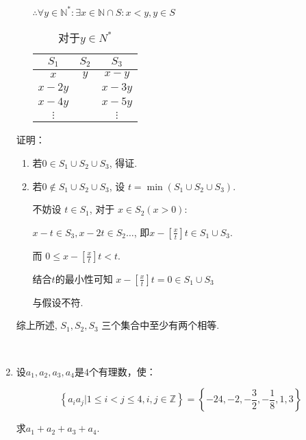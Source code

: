 \documentclass[8pt]{article}
\begin{document}
\begin{enumerate}
\begin{enumerate}[ (i) ]
					$\therefore \forall y \in \mathbb{N}^*:\exists x \in \mathbb{N} \cap S : x < y, y \in S$

					\begin{table}[h]
						\centering
						\begin{tabular}{|c|c|c|}
							\hline $S_1$&$S_2$&$S_3$\\
							\hline $x$&$y$&$x-y$\\
							\hline $x-2y$&&$x-3y$\\
							\hline $x-4y$&&$x-5y$\\
							\hline $\vdots$&&$\vdots$\\
							\hline
						\end{tabular}
						\caption{对于$y \in N^*$}
					\end{table}
			\end{enumerate}

			证明：

			\begin{enumerate} [ i)]

				\item
					若$0\in S_1 \cup S_2 \cup S_3$, 得证.

				\item
					若$0\notin S_1 \cup S_2 \cup S_3$, 设 $t=\min\left(S_1 \cup S_2 \cup S_3\right)$.

					不妨设 $t \in S_1$, 对于 $x \in S_2 \left(x > 0\right)$:

					$x-t \in S_3, x-2t \in S_2 \dots$, 即$x - \left[ \frac{x}{t} \right] t \in S_1 \cup S_3$.

					而 $0 \leq x - \left[ \frac{x}{t} \right] t < t$.

					结合$t$的最小性可知 $x - \left[ \frac{x}{t} \right] t =0 \in S_1 \cup S_3$

					与假设不符.

			\end{enumerate}
			
			综上所述, $S_1, S_2, S_3$ 三个集合中至少有两个相等.

		~\\

		\item

			设$a_1, a_2, a_3, a_4$是$4$个有理数，使：

			$$\left \{a_i a_j | 1 \leq i < j \leq 4, i,j \in \mathbb{Z} \right\} = \left\{-24, -2, -\frac{3}{2}, -\frac{1}{8}, 1, 3\right\}$$

			求$a_1 + a_2 + a_3 + a_4$.


\end{enumerate}
\end{document}
